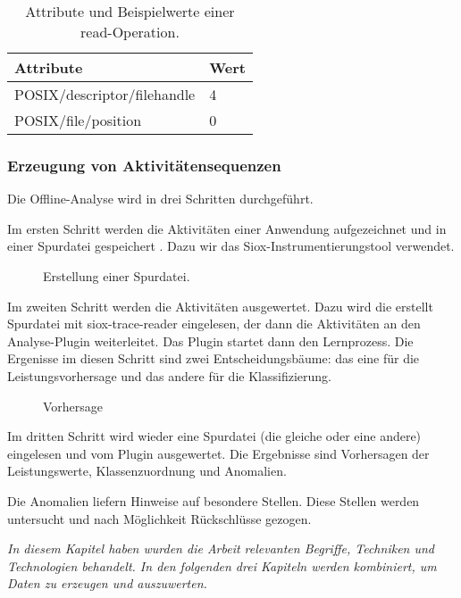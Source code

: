 \begin{table}[h]
	\centering
	\begin{tabular}{l | l}
		Attribute & Wert\\
		\hline
		POSIX/descriptor/filehandle & 4\\
		POSIX/file/position & 0\\
	\end{tabular}
	\caption{Attribute und Beispielwerte einer read-Operation.}
\end{table}



\subsubsection{Erzeugung von Aktivitätensequenzen}

Die Offline-Analyse wird in drei Schritten durchgeführt.

Im ersten Schritt werden die Aktivitäten einer Anwendung aufgezeichnet und in einer Spurdatei gespeichert . 
Dazu wir das Siox-Instrumentierungstool verwendet.
\begin{figure}[h]
	\centering
	
	\caption{Erstellung einer Spurdatei.}
	\label{fig:bas:get_trace}
\end{figure}

Im zweiten Schritt werden die Aktivitäten ausgewertet. 
Dazu wird die erstellt Spurdatei mit siox-trace-reader eingelesen, der dann die Aktivitäten an den Analyse-Plugin weiterleitet.
Das Plugin startet dann den Lernprozess.
Die Ergenisse im diesen Schritt sind zwei Entscheidungsbäume: das eine für die Leistungsvorhersage und das andere für die Klassifizierung.

\begin{figure}[h]
	\centering
	
	\caption{Vorhersage}
	\label{fig:bas:results}
\end{figure}

Im dritten Schritt wird wieder eine Spurdatei (die gleiche oder eine andere) eingelesen und vom Plugin ausgewertet.
Die Ergebnisse sind Vorhersagen der Leistungswerte, Klassenzuordnung und Anomalien.

Die Anomalien liefern Hinweise auf besondere Stellen.
Diese Stellen werden untersucht und nach Möglichkeit Rückschlüsse gezogen.

\bigskip

\textit{In diesem Kapitel haben wurden die Arbeit relevanten Begriffe, Techniken und Technologien behandelt. 
In den folgenden drei Kapiteln werden kombiniert, um Daten zu erzeugen und auszuwerten.}

